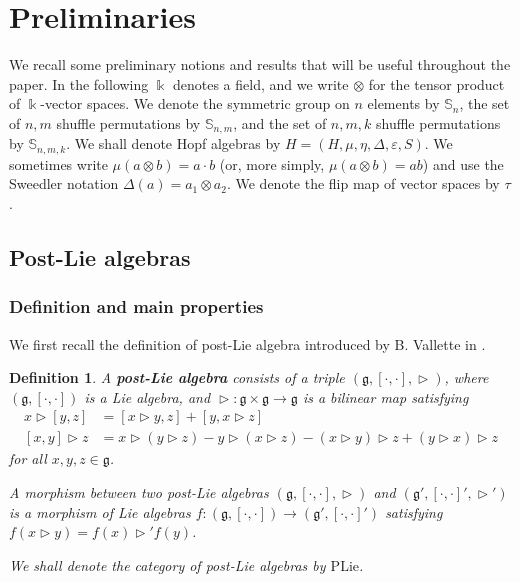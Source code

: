 \documentclass[10pt]{article}
\newtheorem {definition}[lemma] {Definition}
\theoremstyle{definition}
\newcommand{\g}{\mathfrak{g}}
\newcommand{\wt}{\vartriangleright}
\newcommand{\ten}{\otimes}
\begin{document}
\section{Preliminaries}\label{sec:Preliminaries}
We recall some preliminary notions and results that will be useful throughout the paper. In the following $\Bbbk$ denotes a field, and we write $\otimes$ for the tensor product of $\Bbbk$-vector spaces. We denote the symmetric group on $n$ elements by $\mathbb{S}_n$, the set of $n,m$ shuffle permutations by $\mathbb{S}_{n,m}$, and the set of $n,m,k$ shuffle permutations by $\mathbb{S}_{n,m,k}$. We shall denote Hopf algebras by $H= (H,\mu,\eta,\Delta,\varepsilon,S)$. We sometimes write $\mu(a \ten b) = a \cdot b$ (or, more simply, $\mu(a \ten b)= ab$) and use the Sweedler notation $\Delta(a)=a_1 \ten a_2$. We denote the flip map of vector spaces by $\tau$.

\subsection{Post-Lie algebras}\label{sec:PLA} 
\subsubsection{Definition and main properties}
We first recall the definition of post-Lie algebra introduced by B. Vallette in \cite{Vallette}.

\begin{definition}\label{def:PL}
A \textbf{post-Lie algebra} consists of a triple $(\g,[\cdot,\cdot], \wt)$, where $(\g,[\cdot,\cdot])$ is a Lie algebra, and $\wt: \g \times \g \to \g$ is a bilinear map satisfying
\begin{align}
x \wt [y,z] &= [x \wt y,z] + [y,x \wt z] \label{eq:postlie:1}\\
[x,y] \wt z &= x \wt (y \wt z) - y \wt (x \wt z) - (x \wt y) \wt z + (y \wt x) \wt z \label{eq:postlie:2}
\end{align}
for all $x,y,z \in \g$.  

A morphism between two post-Lie algebras $(\g,[\cdot,\cdot], \wt)$ and  $(\g',[\cdot,\cdot]', \wt')$ is a morphism of Lie algebras $f: (\g,[\cdot,\cdot]) \to (\g',[\cdot,\cdot]')$ satisfying $f(x \wt y) = f(x) \wt' f(y)$.

We shall denote the category of post-Lie algebras by $\mathrm{PLie}$.
\end{definition}
\end{document}

